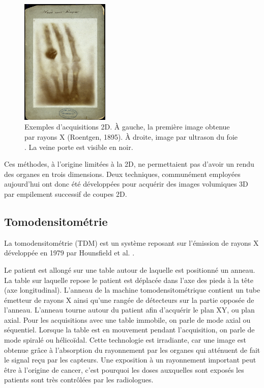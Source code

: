 \begin{figure}
    \centering
    \includegraphics[height=6cm]{Images/first_CT.png}
    \caption{Exemples d'acquisitions 2D. À gauche, la première image obtenue par rayons X (Roentgen, 1895). À droite, image par ultrason du foie \protect\footnotemark. La veine porte est visible en noir.}
    \label{fig:2D imaging}
\end{figure}


Ces méthodes, à l'origine limitées à la 2D, ne permettaient pas d'avoir un rendu des organes en trois dimensions. Deux techniques, communément employées aujourd'hui ont donc été développées pour acquérir des images volumiques 3D par empilement successif de coupes 2D.

\subsection{Tomodensitométrie}
\label{sec:contexte:images:CT}

La tomodensitométrie (TDM) est un système reposant sur l'émission de rayons X développée en 1979 par Hounsfield et al. \cite{Hounsfield1995_CT_machine}.

Le patient est allongé sur une table autour de laquelle est positionné un anneau. La table sur laquelle repose le patient est déplacée dans l'axe des pieds à la tête (axe longitudinal). L'anneau de la machine tomodensitométrique contient un tube émetteur de rayons X ainsi qu'une rangée de détecteurs sur la partie opposée de l'anneau. L'anneau tourne autour du patient afin d'acquérir le plan XY, ou plan axial. Pour les acquisitions avec une table immobile, on parle de mode axial ou séquentiel. Lorsque la table est en mouvement pendant l'acquisition, on parle de mode spiralé ou hélicoïdal. Cette technologie est irradiante, car une image est obtenue grâce à l'absorption du rayonnement par les organes qui atténuent de fait le signal reçu par les capteurs.  Une exposition à un rayonnement important peut être à l'origine de cancer, c'est pourquoi les doses auxquelles sont exposés les patients sont très contrôlées par les radiologues.

